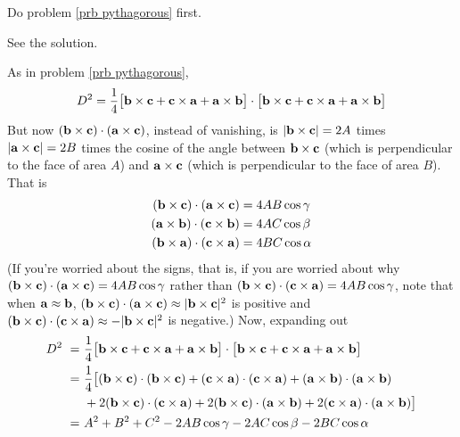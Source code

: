 \begin{hint}
  Do problem \ref{prb pythagorous} first.
\end{hint}

\begin{answer}
See the solution.
\end{answer}

\begin{solution}
As in problem \ref{prb pythagorous},
\begin{equation*}
D^2=\frac{1}{4}
  \big[\mathbf{b}\times \mathbf{c}+\mathbf{c}\times\mathbf{a}+\mathbf{a}\times\mathbf{b}\big]\cdot
  \big[\mathbf{b}\times \mathbf{c}+\mathbf{c}\times\mathbf{a}+\mathbf{a}\times\mathbf{b}\big]
\end{equation*}
But now $(\mathbf{b}\times \mathbf{c})\cdot(\mathbf{a}\times\mathbf{c})$, instead of vanishing,
is $|\mathbf{b}\times \mathbf{c}|=2A$ times $|\mathbf{a}\times\mathbf{c}|=2B$ times
the cosine of the angle between $\mathbf{b}\times \mathbf{c}$ (which is perpendicular
to the face of area $A$) and $\mathbf{a}\times\mathbf{c}$ (which is perpendicular
to the face of area $B$). That is
\begin{align*}
(\mathbf{b}\times \mathbf{c})\cdot(\mathbf{a}\times\mathbf{c})&=4 AB\cos \gamma\\
(\mathbf{a}\times \mathbf{b})\cdot(\mathbf{c}\times\mathbf{b})&=4 AC\cos \beta\\
(\mathbf{b}\times \mathbf{a})\cdot(\mathbf{c}\times\mathbf{a})&=4 BC\cos \alpha
\end{align*}
(If you're worried about the signs, that is, if you are worried about 
why $(\mathbf{b}\times \mathbf{c})\cdot(\mathbf{a}\times\mathbf{c})=4 AB\cos \gamma$
rather than $(\mathbf{b}\times \mathbf{c})\cdot(\mathbf{c}\times\mathbf{a})=4 AB\cos \gamma$,
note  that when $\mathbf{a}\approx\mathbf{b}$, 
$(\mathbf{b}\times \mathbf{c})\cdot(\mathbf{a}\times\mathbf{c})\approx|\mathbf{b}\times\mathbf{c}|^2$ is positive and 
$(\mathbf{b}\times \mathbf{c})\cdot(\mathbf{c}\times\mathbf{a}) \approx -|\mathbf{b}\times\mathbf{c}|^2$ is negative.) Now, expanding out
\begin{align*}
D^2\ =\ &\frac{1}{4}
   \big[\mathbf{b}\times \mathbf{c}+\mathbf{c}\times\mathbf{a}+\mathbf{a}\times\mathbf{b}\big]\cdot
   \big[\mathbf{b}\times \mathbf{c}+\mathbf{c}\times\mathbf{a}+\mathbf{a}\times\mathbf{b}\big] \\
=\ &\frac{1}{4}\big[(\mathbf{b}\times \mathbf{c})\cdot(\mathbf{b}\times \mathbf{c})
     +(\mathbf{c}\times\mathbf{a})\cdot(\mathbf{c}\times\mathbf{a})
     +(\mathbf{a}\times\mathbf{b})\cdot(\mathbf{a}\times\mathbf{b}) \\
&+2(\mathbf{b}\times \mathbf{c})\cdot(\mathbf{c}\times \mathbf{a})
 +2(\mathbf{b}\times \mathbf{c})\cdot(\mathbf{a}\times \mathbf{b})
 +2(\mathbf{c}\times \mathbf{a})\cdot(\mathbf{a}\times \mathbf{b})\big] \\
=\ &A^2+B^2+C^2-2 AB\cos \gamma-2 AC\cos \beta-2 BC\cos \alpha
\end{align*}
\end{solution}




